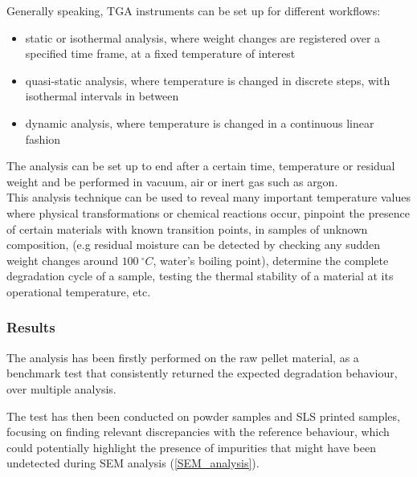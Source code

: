 \documentclass{article}
\begin{document}
        Generally speaking, TGA instruments can be set up for different workflows: 

                \begin{itemize}
                    \item static or isothermal analysis, where weight changes are registered over a specified time frame, 
                    at a fixed temperature of interest
                    \item quasi-static analysis, where temperature is changed in discrete steps, with isothermal intervals in between 
                    \item dynamic analysis, where temperature is changed in a continuous linear fashion
                \end{itemize}

            The analysis can be set up to end after a certain time, temperature or residual weight and be performed 
            in vacuum, air or inert gas such as argon. \\

        This analysis technique can be used to reveal many important temperature values where physical transformations or chemical 
        reactions occur, pinpoint the presence of certain materials with known transition points, in samples of unknown composition, 
        (e.g residual moisture can be detected by checking any sudden weight changes around $100 \ ^{\circ}C $, water's boiling point), 
        determine the complete degradation cycle of a sample, testing the thermal stability of a material at its operational temperature, etc. \\ 
        
            \subsubsection{Results}

            The analysis has been firstly performed on the raw pellet material, as a benchmark test
            that consistently returned the expected degradation behaviour, over multiple analysis. 

            The test has then been conducted on powder samples and SLS printed samples, focusing on finding relevant 
            discrepancies with the reference behaviour, which could potentially highlight the presence of impurities
            that might have been undetected during SEM analysis (\ref{SEM_analysis}). \\ 
\end{document}
